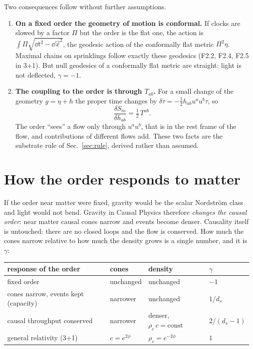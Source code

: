 Two consequences follow without further assumptions.
\begin{enumerate}
\item \textbf{On a fixed order the geometry of motion is conformal.} If clocks are slowed by a
  factor $\Pi$ but the order is the flat one, the action is
  $\int\Pi\sqrt{\dd t^2-\dd\vec x^2}$, the geodesic action of the conformally flat metric
  $\Pi^2\eta$. Maximal chains on sprinklings follow exactly these geodesics (F2.2, F2.4, F2.5 in
  3+1). But null geodesics of a conformally flat metric are straight: light is not deflected,
  $\gamma=-1$.
\item \textbf{The coupling to the order is through $T_{ab}$.} For a small change of the geometry
  $g=\eta+h$ the proper time changes by $\delta\tau=-\tfrac12h_{ab}u^au^b\tau$, so
  \begin{equation}\label{eq:dSdh}
    \frac{\delta S_m}{\delta h_{ab}}=\tfrac12\,T^{ab}.
  \end{equation}
  The order ``sees'' a flow only through $u^au^b$, that is in the rest frame of the flow, and
  contributions of different flows add. These two facts are the substrate rule of
  Sec.~\ref{sec:rule}, derived rather than assumed.
\end{enumerate}

\section{How the order responds to matter}\label{sec:response}

If the order near matter were fixed, gravity would be the scalar Nordstr\"om class and light would
not bend. Gravity in Causal Physics therefore \emph{changes the causal order}: near matter causal cones
narrow and events become denser. Causality itself is untouched: there are no closed loops and the
flow is conserved. How much the cones narrow relative to how much the density grows is a single
number, and it is $\gamma$:

\begin{center}
\begin{tabular}{llll}
\toprule
response of the order & cones & density & $\gamma$\\
\midrule
fixed order & unchanged & unchanged & $-1$\\
cones narrow, events kept (capacity) & narrower & unchanged & $1/d_s$\\
causal throughput conserved & narrower & denser, $\rho_c\,c=\text{const}$ & $2/(d_s-1)$\\
general relativity (3+1) & $c=e^{2\phi}$ & $\rho_c=e^{-2\phi}$ & $1$\\
\bottomrule
\end{tabular}
\end{center}

